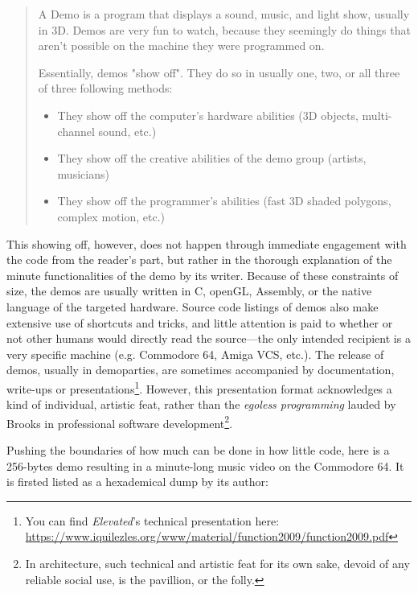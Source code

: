 \documentclass{article}
\begin{document}
\begin{quote}
  A Demo is a program that displays a sound, music, and light show, usually in 3D. Demos are very fun to watch, because they seemingly do things that aren't possible on the machine they were programmed on.

  Essentially, demos "show off". They do so in usually one, two, or all three of three following methods:

  \begin{itemize}
    \item They show off the computer's hardware abilities (3D objects, multi-channel sound, etc.)
    \item They show off the creative abilities of the demo group (artists, musicians)
    \item They show off the programmer's abilities (fast 3D shaded polygons, complex motion, etc.)\cite{noauthor_pc_nodate}
  \end{itemize}
\end{quote}

This showing off, however, does not happen through immediate engagement with the code from the reader's part, but rather in the thorough explanation of the minute functionalities of the demo by its writer. Because of these constraints of size, the demos are usually written in C, openGL, Assembly, or the native language of the targeted hardware. Source code listings of demos also make extensive use of shortcuts and tricks, and little attention is paid to whether or not other humans would directly read the source—the only intended recipient is a very specific machine (e.g. Commodore 64, Amiga VCS, etc.). The release of demos, usually in demoparties, are sometimes accompanied by documentation, write-ups or presentations\footnote{You can find \emph{Elevated}'s technical presentation here: \url{https://www.iquilezles.org/www/material/function2009/function2009.pdf}}. However, this presentation format acknowledges a kind of individual, artistic feat, rather than the \emph{egoless programming} lauded by Brooks in professional software development\footnote{In architecture, such technical and artistic feat for its own sake, devoid of any reliable social use, is the pavillion, or the folly.}.

Pushing the boundaries of how much can be done in how little code, here is a 256-bytes demo resulting in a minute-long music video\cite{noauthor_mind_nodate} on the Commodore 64. It is firsted listed as a hexademical dump by its author:
\end{document}
